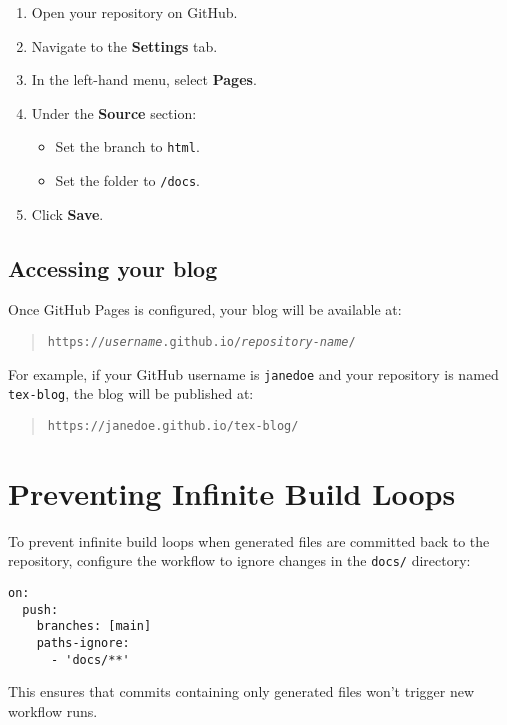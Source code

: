 \documentclass{article}
\begin{document}
\begin{enumerate}
  \item Open your repository on GitHub.
  \item Navigate to the \textbf{Settings} tab.
  \item In the left-hand menu, select \textbf{Pages}.
  \item Under the \textbf{Source} section:
    \begin{itemize}
      \item Set the branch to \texttt{html}.
      \item Set the folder to \texttt{/docs}.
    \end{itemize}
  \item Click \textbf{Save}.
\end{enumerate}

\subsection*{Accessing your blog}

Once GitHub Pages is configured, your blog will be available at:

\begin{quote}
\texttt{https://\textit{username}.github.io/\textit{repository-name}/}
\end{quote}

For example, if your GitHub username is \texttt{janedoe} and your repository is named \texttt{tex-blog}, the blog will be published at:

\begin{quote}
\texttt{https://janedoe.github.io/tex-blog/}
\end{quote}

\section{Preventing Infinite Build Loops}

To prevent infinite build loops when generated files are committed back to the repository,
configure the workflow to ignore changes in the \texttt{docs/} directory:

\begin{verbatim}
on: 
  push:
    branches: [main]
    paths-ignore:
      - 'docs/**'
\end{verbatim}

This ensures that commits containing only generated files won't trigger new workflow runs.
\end{document}
